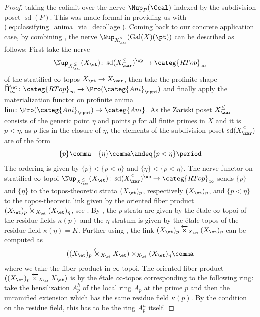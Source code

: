 \documentclass[leqno]{article}
\renewcommand{\orientedtimes}{\mathbin{\overleftarrow{\times}}}
\renewcommand{\Gal}{\mathrm{Gal}}
\newcommand{\Ani}{\categ{Ani}}
\newcommand{\RTop}{\categ{RTop}}
\newcommand{\Pietprofin}{\widehat{\Pi}_{\infty}^{\et}}
\newcommand{\Zpos}[1]{{#1}_{\zar}^{\leq}}
\DeclareMathOperator{\subdiv}{sd}
\newcommand{\Anifin}{\Ani_{\uppi}}
\newcommand{\ProAnifin}{\Pro(\Anifin)}
\begin{document}
\begin{proof}
taking the colimit over the nerve $\Nup_P(\Ccal)$ indexed by the subdivision poset $\subdiv(P)$. This was made formal in \cite[Proposition 7.5]{The_condensed_homotopy_type} providing us with (\ref{eq:classifying_anima_via_decollage}).
%
Coming back to our concrete application case, by combining \cite[Construction 8.71, Example 8.72 and Theorem 10.4.3]{Exodromy}, the nerve $\Nup_{\Zpos{X}}(\Gal(X)(\pt))$
can be described as follows: First take the nerve  $$ \Nup_{\Zpos{X}}(X_{\et})\colon\subdiv(\Zpos{X})^{\op} \to \RTop_{\infty} $$ of the stratified $\infty$-topos $X_{\et}\rightarrow X_{\zar}$, then take the profinite shape $\Pietprofin\colon \RTop_{\infty} \rightarrow \ProAnifin$ and finally apply the materialization functor on profinite anima $ \lim \colon \ProAnifin \to \Ani $.
%
As the Zariski poset $\Zpos{X}$ consists of the generic point $\eta$ and points $p$ for all finite primes in $X$ and it is $p<\eta$, as $p$ lies in the closure of $\eta$, the elements of the subdivision poset $\subdiv(\Zpos{X})$ are of the form
    \begin{equation*}
        \{p\} \comma \quad \{\eta\} \comma \andeq \{p  < \eta \} \period
    \end{equation*}
The ordering is given by $ \{p\} < \{p  < \eta \}$ and $\{ \eta \}< \{p  < \eta \}$. The nerve functor on stratified $\infty$-topoi $\Nup_{\Zpos{X}}(X_{\et})\colon\subdiv(\Zpos{X})^{\op} \to \RTop_{\infty} $ sends $\{p\}$ and $\{\eta\}$ to the topos-theoretic strata $(X_{\et})_p$, respectively $(X_{\et})_{\eta}$, and $\{p < \eta\}$ to the topos-theoretic link given by the oriented fiber product $(X_{\et})_p \orientedtimes_{X_{\et}}(X_{\et})_{\eta}$, see \cite[Construction 8.7.1]{Exodromy}.
By \cite[Example 9.2.4]{Exodromy}, the $p$-strata are given by the \'etale $\infty$-topoi of the residue fields $\kappa(p)$ and the $\eta$-stratum is given by the \'etale topos of the residue field $\kappa(\eta)=K$.
Further using \cite[Example 5.4.10]{Exodromy}, the link $(X_{\et})_p \orientedtimes_{X_{\et}} (X_{\et})_{\eta}$ can be computed as $$((X_{\et})_p \orientedtimes_{X_{\et}} X_{\et}) \times_{X_{\et}} (X_{\et})_{\eta}\comma$$ where we take the fiber product in $\infty$-topoi.
The oriented fiber product $((X_{\et})_p \orientedtimes_{X_{\et}} X_{\et})$ is by \cite[Example 6.7.4]{Exodromy} the \'etale $\infty$-topos corresponding to the following ring: take the hensilization $A_p^h$ of the local ring $A_p$ at the prime $p$ and then the unramified extension which has the same residue field $\kappa(p)$. By the condition on the residue field, this has to be the ring $A_p^h$ itself.

\end{proof}
\end{document}
